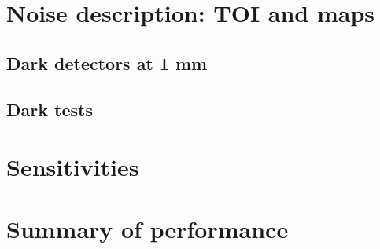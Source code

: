 \documentclass[a4paper, 11pt]{article} %
\begin{document}
\section{Noise description: TOI and maps}
\label{se:noise}

\subsection{Dark detectors at 1 mm}


\subsection{Dark tests}
\label{se:dark}



\section{Sensitivities}
\label{se:nefd}



\section{Summary of performance}








\end{document}
